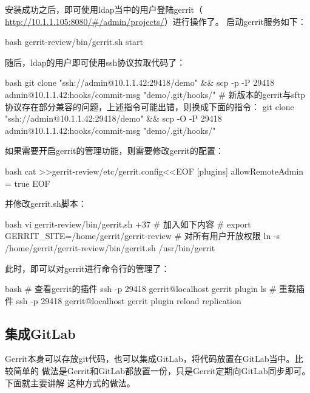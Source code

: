 安装成功之后，即可使用ldap当中的用户登陆gerrit（\url{ http://10.1.1.105:8080/#/admin/projects/}）进行操作了。
启动gerrit服务如下：
\begin{code-block}{bash}
gerrit-review/bin/gerrit.sh start
\end{code-block}

随后，ldap的用户即可使用ssh协议拉取代码了：
\begin{code-block}{bash}
git clone "ssh://admin@10.1.1.42:29418/demo" && scp -p -P 29418 admin@10.1.1.42:hooks/commit-msg "demo/.git/hooks/"
# 新版本的gerrit与sftp协议存在部分兼容的问题，上述指令可能出错，则换成下面的指令：
git clone "ssh://admin@10.1.1.42:29418/demo" && scp -O -P 29418 admin@10.1.1.42:hooks/commit-msg "demo/.git/hooks/"
\end{code-block}

如果需要开启gerrit的管理功能，则需要修改gerrit的配置：
\begin{code-block}{bash}
cat >>gerrit-review/etc/gerrit.config<<EOF
[plugins]
        allowRemoteAdmin = true
EOF
\end{code-block}
并修改gerrit.sh脚本：
\begin{code-block}{bash}
vi gerrit-review/bin/gerrit.sh +37
# 加入如下内容
# export GERRIT_SITE=/home/gerrit/gerrit-review
# 对所有用户开放权限
ln -s /home/gerrit/gerrit-review/bin/gerrit.sh /usr/bin/gerrit
\end{code-block}

此时，即可以对gerrit进行命令行的管理了：
\begin{code-block}{bash}
# 查看gerrit的插件
ssh -p 29418 gerrit@localhost gerrit plugin ls
# 重载插件
ssh -p 29418 gerrit@localhost gerrit plugin reload replication
\end{code-block}

\subsection{集成GitLab}
Gerrit本身可以存放git代码，也可以集成GitLab，将代码放置在GitLab当中。比较简单的
做法是Gerrit和GitLab都放置一份，只是Gerrit定期向GitLab同步即可。下面就主要讲解
这种方式的做法。

